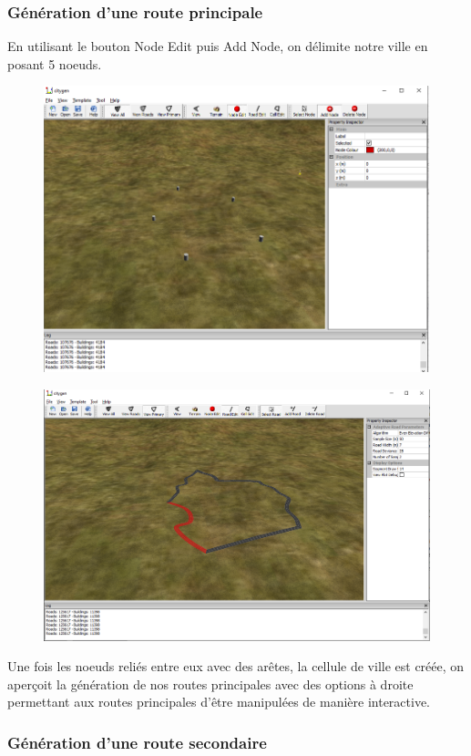 \subsubsection{\textbf{Génération d'une route principale}}

En utilisant le bouton Node Edit puis Add Node, on délimite notre ville en posant 5 noeuds.

\begin{figure} 
\begin{minipage}[c]{.46\linewidth}
	\includegraphics[height = 5 cm]{images/figure1.png}\\
\end{minipage} \hfill 
\begin{minipage}[c]{.46\linewidth}
	\includegraphics[height = 5 cm]{images/figure2.png}\\
\end{minipage}
\end{figure}

Une fois les noeuds reliés entre eux avec des arêtes, la cellule de ville est créée, on aperçoit la génération de nos routes principales avec des options à droite permettant aux routes principales d'être manipulées de manière interactive.

\subsubsection{\textbf{Génération d'une route secondaire}}

